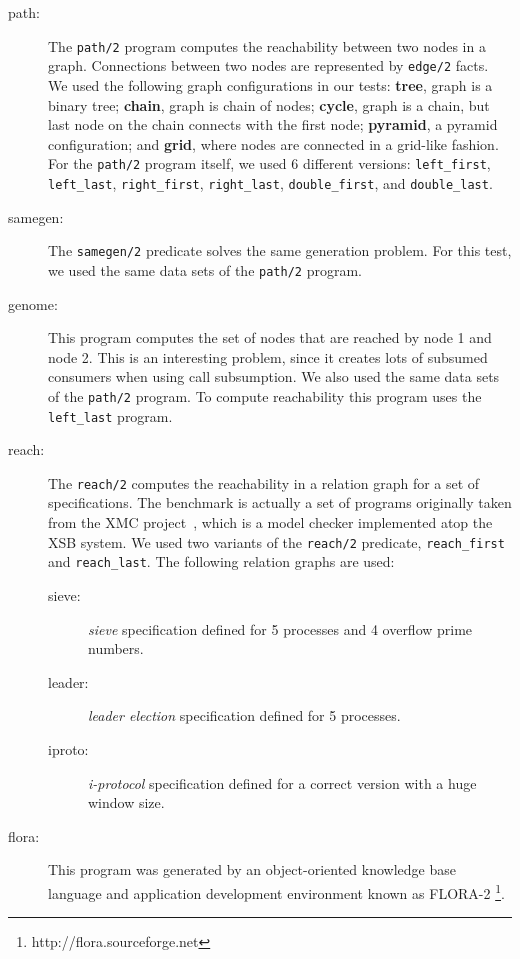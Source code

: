 \begin{description}
   
   \item[path:] The \texttt{path/2} program computes the reachability between two nodes in a graph.
   Connections between two nodes are represented by \texttt{edge/2} facts.
   We used the following graph configurations in our tests: \textbf{tree}, graph is a
   binary tree; \textbf{chain}, graph is chain of nodes; \textbf{cycle}, graph is a chain, but
   last node on the chain connects with the first node; \textbf{pyramid}, a pyramid configuration;
   and \textbf{grid}, where nodes are connected in a grid-like fashion.
   For the \texttt{path/2} program itself, we used 6 different versions: \texttt{left\_first},
   \texttt{left\_last}, \texttt{right\_first}, \texttt{right\_last},
   \texttt{double\_first}, and \texttt{double\_last}.
    
   \item[samegen:] The \texttt{samegen/2} predicate solves the same generation problem.
   For this test, we used the same data sets of the \texttt{path/2} program.
   
   \item[genome:] This program computes the set of nodes that are reached by node 1 and node 2.
   This is an interesting problem, since it creates lots of subsumed consumers when using
   call subsumption. We also used the same data sets of the \texttt{path/2} program.
   To compute reachability this program uses the \texttt{left\_last} program.
   
   \item[reach:] The \texttt{reach/2} computes the reachability in a relation graph for a set of
   specifications. The benchmark is actually a set of programs originally taken from the
   XMC project~\cite{system-xmc,RamakrishnanCR-00}, which is a model checker implemented
   atop the XSB system. We used two variants of the \texttt{reach/2} predicate,
   \texttt{reach\_first} and \texttt{reach\_last}.
   The following relation graphs are used:
   
      \begin{description}
         
         \item[sieve:] \emph{sieve} specification defined for 5 processes and 4 overflow prime numbers.
         
         \item[leader:] \emph{leader election} specification defined for 5 processes.
         
         \item[iproto:] \emph{i-protocol} specification defined for a correct version with a huge window size.

      \end{description}
      
   \item[flora:] This program was generated by an object-oriented knowledge base language and application 
               development environment known as FLORA-2 \cite{Yang-00} \footnote{http://flora.sourceforge.net}.
\end{description}

